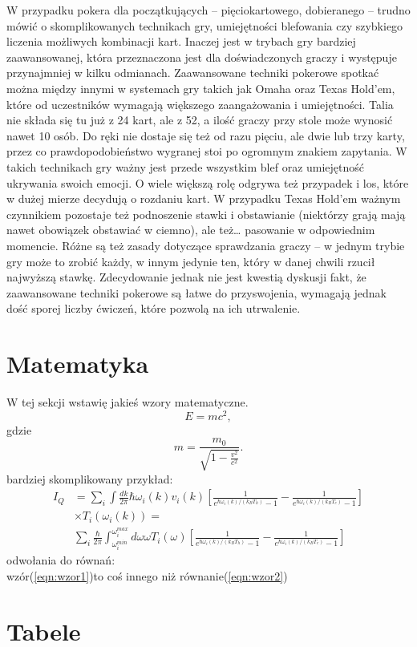 \documentclass{article}
\begin{document}
W przypadku pokera dla początkujących – pięciokartowego, dobieranego – trudno mówić o skomplikowanych technikach gry, umiejętności blefowania czy szybkiego liczenia możliwych kombinacji kart. Inaczej jest w trybach gry bardziej zaawansowanej, która przeznaczona jest dla doświadczonych graczy i występuje przynajmniej w kilku odmianach.
Zaawansowane techniki pokerowe spotkać można między innymi w systemach gry takich jak Omaha oraz Texas Hold’em, które od uczestników wymagają większego zaangażowania i umiejętności. Talia nie składa się tu już z 24 kart, ale z 52, a ilość graczy przy stole może wynosić nawet 10 osób. Do ręki nie dostaje się też od razu pięciu, ale dwie lub trzy karty, przez co prawdopodobieństwo wygranej stoi po ogromnym znakiem zapytania. W takich technikach gry ważny jest przede wszystkim blef oraz umiejętność ukrywania swoich emocji. O wiele większą rolę odgrywa też przypadek i los, które w dużej mierze decydują o rozdaniu kart. W przypadku Texas Hold’em ważnym czynnikiem pozostaje też podnoszenie stawki i obstawianie (niektórzy grają mają nawet obowiązek obstawiać w ciemno), ale też… pasowanie w odpowiednim momencie. Różne są też zasady dotyczące sprawdzania graczy – w jednym trybie gry może to zrobić każdy, w innym jedynie ten, który w danej chwili rzucił najwyższą stawkę. Zdecydowanie jednak nie jest kwestią dyskusji fakt, że zaawansowane techniki pokerowe są łatwe do przyswojenia, wymagają jednak dość sporej liczby ćwiczeń, które pozwolą na ich utrwalenie.


\section{Matematyka}\label{sec:matematyka}
W tej sekcji wstawię jakieś wzory matematyczne.
\begin{equation}
    E = mc^2,
    \label{eqn:wzor1}
\end{equation}
gdzie
\begin{equation}
    m = \frac{m_0}{\sqrt{1-\frac{v^2}{c^2}}}.
\end{equation}
bardziej skomplikowany przykład:
\begin{equation}
\begin{split}
I_Q & = \sum_i \int \frac{dk}{2 \pi} \hbar \omega_i(k) v_i(k) \left[\frac{1}{e^{\hbar \omega_i(k) / (k_B T_h)} -1} - \frac{1}{e^{\hbar \omega_i(k) / (k_B T_c)} -1} \right] \\
& \times T_{i}(\omega_i(k)) = \\
& \sum_i \frac{\hbar}{2\pi} \int_{\omega_i^{min}}^{\omega_i^{max}} d\omega \omega T_{i}(\omega) \left[\frac{1}{e^{\hbar \omega_i(k) / (k_B T_h)} -1} - \frac{1}{e^{\hbar \omega_i(k) / (k_B T_c)} -1} \right]
\end{split}
\label{eqn:wzor2}
\end{equation} 
odwołania do równań:\\
wzór(\ref{eqn:wzor1})to coś innego niż równanie(\ref{eqn:wzor2})\\



\section{Tabele}\label{sec:tabele}
\end{document}
